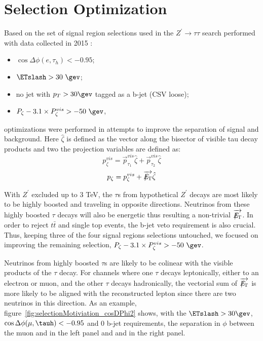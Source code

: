 \section{Selection Optimization}\label{sec:selectionOpt}

Based on the set of signal region selections used in the $Z^\prime \rightarrow \tau\tau$ 
search performed with data collected in 2015 \cite{ZprimeTauTau2015}:
\begin{itemize}
  \item $\cos{\Delta \phi (e,\tau_{h})}<-0.95$;
  \item $\ETslash>30~\gev$;
  \item no jet with $p_T>30\gev$ tagged as a b-jet (CSV loose);
  \item $P_{\zeta}- 3.1 \times P_{\zeta}^{vis} > -50~\gev$,
\end{itemize}
optimizations were performed in attempts to improve the separation 
of signal and background. Here $\hat{\zeta}$ is defined as the vector along 
the bisector of visible tau decay products and two the projection variables 
are defined as:
\begin{equation}
   p_{\zeta}^{vis} = \overrightarrow{p}_{\tau_{1}}^{vis}\hat{\zeta}+\overrightarrow{p}_{\tau_{2}}^{vis}\hat{\zeta}
\label{eq:zetavis}
\end{equation}
\begin{equation}
   p_{\zeta} = p_{\zeta}^{vis}+\overrightarrow{{E\!\!\!\!/_{\rm T}}}\hat{\zeta}
\label{eq:zeta}
\end{equation}

With $Z^\prime$ excluded up to 3 TeV, the $\tau$s from hypothetical $Z^\prime$ 
decays are most likely to be highly boosted and traveling in opposite directions. 
Neutrinos from these highly boosted $\tau$ decays will also be energetic thus 
resulting a non-trivial $\overrightarrow{{E\!\!\!\!/_{\rm T}}}$. In order to reject 
$t\bar{t}$ and single top events, the b-jet veto requirement is also crucial. Thus, 
keeping three of the four signal regions selections untouched, we focused on 
improving the remaining selection, $P_{\zeta}- 3.1 \times P_{\zeta}^{vis} > -50~\gev$.

Neutrinos from highly boosted $\tau$s are likely to be colinear with the visible 
products of the $\tau$ decay. For channels where one $\tau$ decays leptonically, either 
to an electron or muon, and the other $\tau$ decays hadronically, the vectorial sum of 
$\overrightarrow{{E\!\!\!\!/_{\rm T}}}$ is more likely to be aligned with the 
reconstructed lepton since there are two neutrinos in this direction. As an example, 
figure~\ref{fig:selectionMotiviation_cosDPhi2} shows, with the $\ETslash>30 \gev$, 
$\cos{\Delta \phi (\mu,\tauh)}<-0.95$ and 0 b-jet requirements, the separation in 
$\phi$ between the muon and \ETslash in the left panel and \tauh and \ETslash in the 
right panel.

